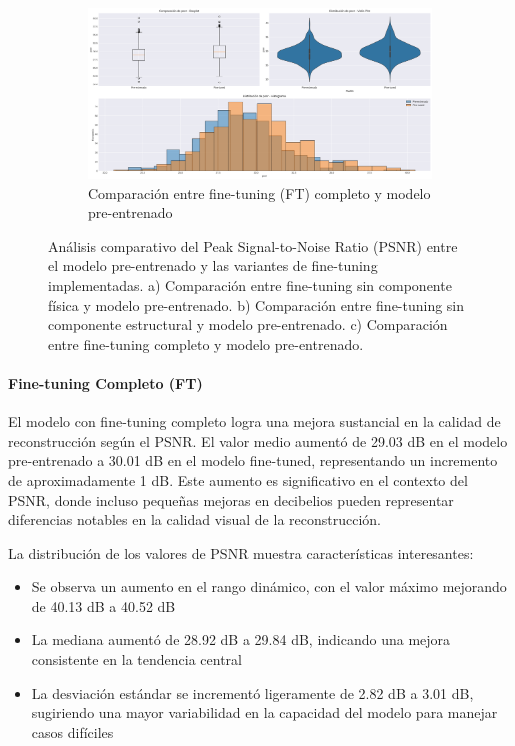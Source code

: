 \begin{figure}[H]
    \begin{subfigure}[b]{0.7\textwidth}
        \centering
        \includegraphics[width=\textwidth]{Images/comparison_plots_psnr_sup.png}
        \caption{Comparación entre fine-tuning (FT) completo y modelo pre-entrenado}
        \label{fig:psnr_box}
    \end{subfigure}
    
    \caption{Análisis comparativo del Peak Signal-to-Noise Ratio (PSNR) entre el modelo pre-entrenado y las variantes de fine-tuning implementadas. a) Comparación entre fine-tuning sin componente física y modelo pre-entrenado. b) Comparación entre fine-tuning sin componente estructural y modelo pre-entrenado. c) Comparación entre fine-tuning completo y modelo pre-entrenado.}
    \label{fig:psnr_analysis}
\end{figure}


\paragraph{Fine-tuning Completo (FT)}
El modelo con fine-tuning completo logra una mejora sustancial en la calidad de reconstrucción según el PSNR. El valor medio aumentó de 29.03 dB en el modelo pre-entrenado a 30.01 dB en el modelo fine-tuned, representando un incremento de aproximadamente 1 dB. Este aumento es significativo en el contexto del PSNR, donde incluso pequeñas mejoras en decibelios pueden representar diferencias notables en la calidad visual de la reconstrucción.

La distribución de los valores de PSNR muestra características interesantes:

\begin{itemize}
    \item Se observa un aumento en el rango dinámico, con el valor máximo mejorando de 40.13 dB a 40.52 dB
    \item La mediana aumentó de 28.92 dB a 29.84 dB, indicando una mejora consistente en la tendencia central
    \item La desviación estándar se incrementó ligeramente de 2.82 dB a 3.01 dB, sugiriendo una mayor variabilidad en la capacidad del modelo para manejar casos difíciles
\end{itemize}

